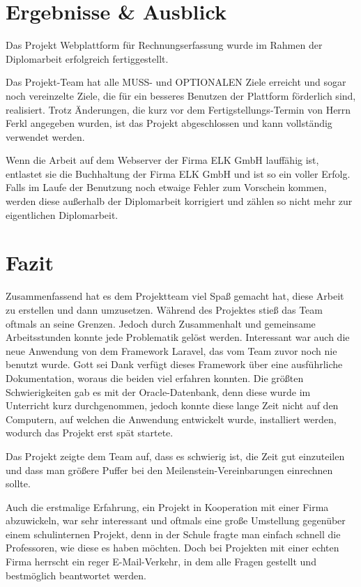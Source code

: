 \documentclass[
fontsize=12pt,
twoside=false,
a4paper,
bibliography=totoc, 		%
listof=totoc,				%
toc=bibliographynumbered, 	%
listof=numbered,			%
]{scrreprt}
\begin{document}
\chapter{Ergebnisse \& Ausblick}
Das Projekt \glqq Webplattform für Rechnungserfassung\grqq{} wurde im Rahmen der Diplomarbeit erfolgreich fertiggestellt.

Das Projekt-Team hat alle MUSS- und OPTIONALEN Ziele erreicht und sogar noch vereinzelte Ziele, die für ein besseres Benutzen der Plattform förderlich sind, realisiert. Trotz Änderungen, die kurz vor dem Fertigstellungs-Termin von Herrn Ferkl angegeben wurden, ist das Projekt abgeschlossen und kann vollständig verwendet werden.

Wenn die Arbeit auf dem Webserver der Firma ELK GmbH lauffähig ist, entlastet sie die Buchhaltung der Firma ELK GmbH und ist so ein voller Erfolg. Falls im Laufe der Benutzung noch etwaige Fehler zum Vorschein kommen, werden diese außerhalb der Diplomarbeit korrigiert und zählen so nicht mehr zur eigentlichen Diplomarbeit. 
\chapter{Fazit}
Zusammenfassend hat es dem Projektteam viel Spaß gemacht hat, diese Arbeit zu erstellen und dann umzusetzen. Während des Projektes stieß das Team oftmals an seine Grenzen. Jedoch durch Zusammenhalt und gemeinsame Arbeitsstunden konnte jede Problematik gelöst werden. Interessant war auch die neue Anwendung von dem Framework Laravel, das vom Team zuvor noch nie benutzt wurde. Gott sei Dank verfügt dieses Framework über eine ausführliche Dokumentation, woraus die beiden viel erfahren konnten. Die größten Schwierigkeiten gab es mit der Oracle-Datenbank, denn diese wurde im Unterricht kurz durchgenommen, jedoch konnte diese lange Zeit nicht auf den Computern, auf welchen die Anwendung entwickelt wurde, installiert werden, wodurch das Projekt erst spät startete.

Das Projekt zeigte dem Team auf, dass es schwierig ist, die Zeit gut einzuteilen und dass man größere Puffer bei den Meilenstein-Vereinbarungen einrechnen sollte.

Auch die erstmalige Erfahrung, ein Projekt in Kooperation mit einer Firma abzuwickeln, war sehr interessant und oftmals eine große Umstellung gegenüber einem schulinternen Projekt, denn in der Schule fragte man einfach schnell die Professoren, wie diese es haben möchten. Doch bei Projekten mit einer echten Firma herrscht ein reger E-Mail-Verkehr, in dem alle Fragen gestellt und bestmöglich beantwortet werden.
\end{document}

